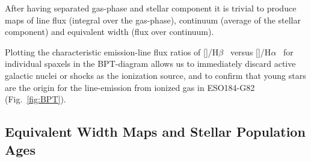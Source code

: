 \documentclass[traditabstract, referee]{aa}
\newcommand{\hb}{H$\beta$}
\newcommand{\ha}{H$\alpha$}
\newcommand{\oiii}{[\ion{O}{iii}]}
\newcommand{\nii}{[\ion{N}{ii}]}
\begin{document}
After having separated gas-phase and stellar component it is trivial to produce maps of line flux (integral over the gas-phase), continuum (average of the stellar component) and equivalent width (flux over continuum). 

Plotting the characteristic emission-line flux ratios of \oiii/\hb~ versus \nii/\ha~ for individual spaxels in the BPT-diagram \citep{1981PASP...93....5B} allows us to immediately discard active galactic nuclei or shocks as the ionization source, and to confirm that young stars are the origin for the line-emission from ionized gas in ESO184-G82 (Fig.~\ref{fig:BPT}).


\subsection{Equivalent Width Maps and Stellar Population Ages}
\end{document}
